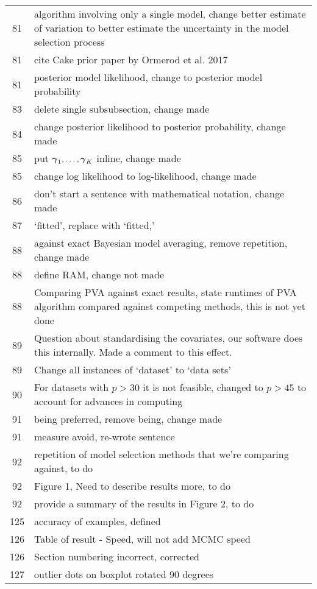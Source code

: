 \documentclass{amsart}
\begin{document}
\begin{tabular}{cl}
 81  &  algorithm involving only a single model, change better estimate of
variation to better estimate the uncertainty in the model selection process\\
 81  &  cite Cake prior paper by Ormerod et al. 2017\\
 81  &  posterior model likelihood, change to posterior model probability\\
 83  &  delete single subsubsection, change made\\
 84  &  change posterior likelihood to posterior probability, change made\\
 85  &  put ${\boldsymbol \gamma}_1, \ldots, {\boldsymbol \gamma}_K$ inline, change made\\
 85  &  change log likelihood to log-likelihood, change made\\
 86  &  don't start a sentence with mathematical notation, change made\\
 87  &  `fitted', replace with `fitted,'\\
 88  &  against exact Bayesian model averaging, remove repetition, change
			made\\
 88  &  define RAM, change not made\\
 88  &  Comparing PVA against exact results, state runtimes of PVA
			algorithm compared against competing methods, this is not yet done\\
 89  &  Question about standardising the covariates, our software does this
			internally. Made a comment to this effect.\\
 89  &  Change all instances of `dataset' to `data sets'\\
 90  &  For datasets with $p > 30$ it is not feasible, changed to $p > 45$
			to account for advances in computing\\
 91  &  being preferred, remove being, change made\\
 91  &  measure avoid, re-wrote sentence\\
 92  &  repetition of model selection methods that we're comparing against,
			to do\\
 92  &  Figure 1, Need to describe results more, to do\\
 92  &  provide a summary of the results in Figure 2, to do \\
 125  &  accuracy of examples, defined\\
 126  &  Table of result - Speed, will not add MCMC speed\\
 126  &  Section numbering incorrect, corrected\\
 127  &  outlier dots on boxplot rotated 90 degrees\\

\end{tabular}
\end{document}
